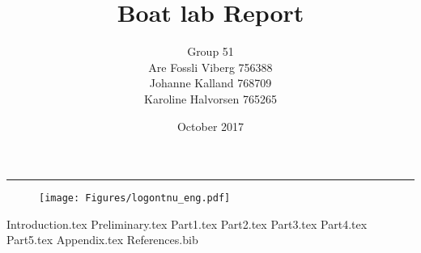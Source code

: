 \documentclass[11pt,a4paper]{article} %
\title{Boat lab Report}
\author{Group 51 \\ Are Fossli Viberg 756388 \\ Johanne Kalland 768709\\ Karoline Halvorsen 765265 }
\date{October 2017}
\numberwithin{equation}{section}
\begin{document}
\begin{titlepage}
    \maketitle
    \rule{\linewidth}{0.5mm}
    \begin{figure}
    \centering
    \texttt{[image: Figures/logontnu\_eng.pdf]}
    \end{figure}
    \thispagestyle{empty}
\end{titlepage} 

\newpage
\tableofcontents
\thispagestyle{empty} %





\newpage
{Introduction.tex}
\newpage
{Preliminary.tex}
\newpage
{Part1.tex}
\newpage
{Part2.tex}
\newpage
{Part3.tex}
\newpage
{Part4.tex}
\newpage
{Part5.tex}
\newpage
{Appendix.tex}
\newpage
{References.bib}
\end{document}
